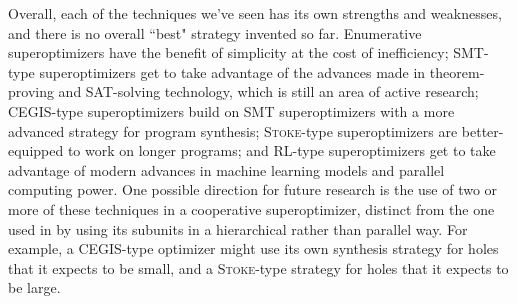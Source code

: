 \documentclass[12pt,twoside]{reedthesis}
\begin{document}
    Overall, each of the techniques we've seen has its own strengths and weaknesses, and there is no overall ``best" strategy invented so far. 
    Enumerative superoptimizers have the benefit of simplicity at the cost of inefficiency;
    SMT-type superoptimizers get to take advantage of the advances made in theorem-proving and SAT-solving technology, which is still an area of active research;
    CEGIS-type superoptimizers build on SMT superoptimizers with a more advanced strategy for program synthesis;
    \textsc{Stoke}-type superoptimizers are better-equipped to work on longer programs;
    and RL-type superoptimizers get to take advantage of modern advances in machine learning models and parallel computing power.
    One possible direction for future research is the use of two or more of these techniques in a cooperative superoptimizer, distinct from the one used in \cite{phothilimthana2016scaling} by using its subunits in a hierarchical rather than parallel way. For example, a CEGIS-type optimizer might use its own synthesis strategy for holes that it expects to be small, and a \textsc{Stoke}-type strategy for holes that it expects to be large.


\backmatter


\end{document}
